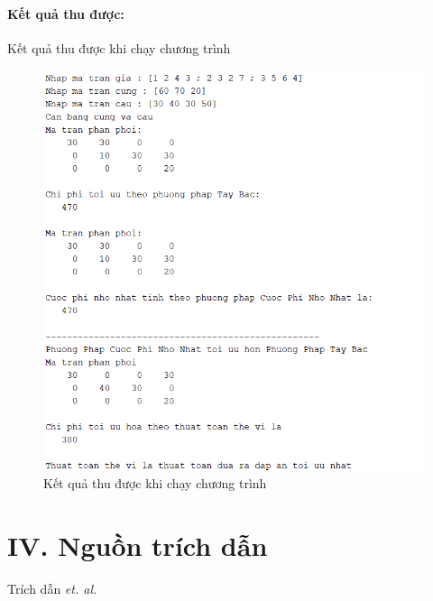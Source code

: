 \documentclass{article}
\begin{document}
\paragraph{Kết quả thu được:}
\begin{flushleft}
    \hspace{0.4cm}Kết quả thu được khi chạy chương trình
\end{flushleft}
\begin{figure}[ht]
    \centering
    \includegraphics[scale=0.8, frame]{Images/code2.png}
    \caption{Kết quả thu được khi chạy chương trình}
    \label{fig:enter-label}
\end{figure}

\newpage
\section*{IV. Nguồn trích dẫn}
\setcounter{section}{1}\setlength{\baselineskip}{15pt}
\setcounter{subsection}{0}
\setcounter{subsubsection}{0}
\label{sec:citations}
Trích dẫn \textit{et. al.} \cite{meyer2023matrix,anton2013elementary,amidror2013mastering,QuyHoachTuyenTinh,GiaoTrinhQuyHoachTuyenTinh}



\end{document}
